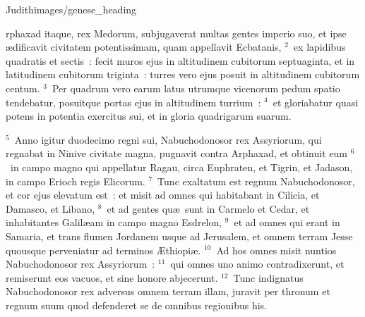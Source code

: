 {Judith}{images/genese_heading}


\bchapter
{}rphaxad itaque, rex Medorum, subjugaverat multas gentes imperio suo, et ipse \ae dificavit civitatem potentissimam, quam appellavit Ecbatanis,
${}^{2}$~ex lapidibus quadratis et sectis~: fecit muros ejus in altitudinem cubitorum septuaginta, et in latitudinem cubitorum triginta~: turres vero ejus posuit in altitudinem cubitorum centum.
${}^{3}$~Per quadrum vero earum latus utrumque vicenorum pedum spatio tendebatur, posuitque portas ejus in altitudinem turrium~:
${}^{4}$~et gloriabatur quasi potens in potentia exercitus sui, et in gloria quadrigarum suarum.


${}^{5}$~Anno igitur duodecimo regni sui, Nabuchodonosor rex Assyriorum, qui regnabat in Ninive civitate magna, pugnavit contra Arphaxad, et obtinuit eum
${}^{6}$~in campo magno qui appellatur Ragau, circa Euphraten, et Tigrin, et Jadason, in campo Erioch regis Elicorum.
${}^{7}$~Tunc exaltatum est regnum Nabuchodonosor, et cor ejus elevatum est~: et misit ad omnes qui habitabant in Cilicia, et Damasco, et Libano,
${}^{8}$~et ad gentes qu\ae\ sunt in Carmelo et Cedar, et inhabitantes Galil\ae am in campo magno Esdrelon,
${}^{9}$~et ad omnes qui erant in Samaria, et trans flumen Jordanem usque ad Jerusalem, et omnem terram Jesse quousque perveniatur ad terminos \AE thiopi\ae .
${}^{10}$~Ad hos omnes misit nuntios Nabuchodonosor rex Assyriorum~:
${}^{11}$~qui omnes uno animo contradixerunt, et remiserunt eos vacuos, et sine honore abjecerunt.
${}^{12}$~Tunc indignatus Nabuchodonosor rex adversus omnem terram illam, juravit per thronum et regnum suum quod defenderet se de omnibus regionibus his.

